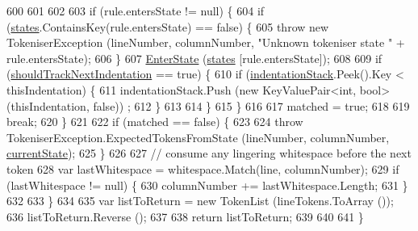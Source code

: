\begin{DoxyCode}
600 
601 
602 
603                     \textcolor{keywordflow}{if} (rule.entersState != null) \{
604                         \textcolor{keywordflow}{if} (\hyperlink{a00047_a2c65c0ba90f973e459583badefef216a}{states}.ContainsKey(rule.entersState) == \textcolor{keyword}{false}) \{
605                             \textcolor{keywordflow}{throw} \textcolor{keyword}{new} TokeniserException (lineNumber, columnNumber, \textcolor{stringliteral}{"Unknown tokeniser
       state "} + rule.entersState);
606                         \}
607                         \hyperlink{a00047_ad3ef08f822b310d9864774b057b96995}{EnterState} (\hyperlink{a00047_a2c65c0ba90f973e459583badefef216a}{states} [rule.entersState]);
608 
609                         \textcolor{keywordflow}{if} (\hyperlink{a00047_ac670aac2245cbd4694dfbd5b69313218}{shouldTrackNextIndentation} == \textcolor{keyword}{true}) \{
610                             \textcolor{keywordflow}{if} (\hyperlink{a00047_a6631a1b1a9109258ab18927e7587ff9b}{indentationStack}.Peek().Key < thisIndentation) \{
611                                 indentationStack.Push (\textcolor{keyword}{new} KeyValuePair<int, bool>(thisIndentation, \textcolor{keyword}{false}))
      ;
612                             \}
613                                 
614                         \}
615                     \}
616 
617                     matched = \textcolor{keyword}{true};
618 
619                     \textcolor{keywordflow}{break};
620                 \}
621 
622                 \textcolor{keywordflow}{if} (matched == \textcolor{keyword}{false}) \{
623 
624                     \textcolor{keywordflow}{throw} TokeniserException.ExpectedTokensFromState (lineNumber, columnNumber, 
      \hyperlink{a00047_ac90b7dce8103425a148f9e8588f14137}{currentState});
625                 \}
626 
627                 \textcolor{comment}{// consume any lingering whitespace before the next token}
628                 var lastWhitespace = whitespace.Match(line, columnNumber);
629                 \textcolor{keywordflow}{if} (lastWhitespace != null) \{
630                     columnNumber += lastWhitespace.Length;
631                 \}
632 
633             \}
634 
635             var listToReturn = \textcolor{keyword}{new} TokenList (lineTokens.ToArray ());
636             listToReturn.Reverse ();
637 
638             \textcolor{keywordflow}{return} listToReturn;
639 
640 
641         \}
\end{DoxyCode}


